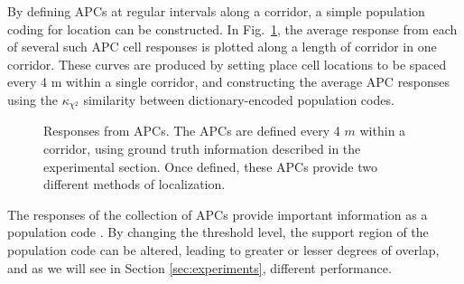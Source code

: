 By defining APCs at regular intervals along a corridor, a simple population coding for location can be constructed. In Fig.~\ref{fig:APCMany}, the average response from each of several such APC cell responses is plotted along a length of corridor in one corridor.  These curves are produced by setting place cell locations to be spaced every 4 m within a single corridor, and constructing the average APC responses using the $\kappa_{\chi^2}$ similarity between dictionary-encoded population codes.


\begin{figure}
\centering
  \setlength{}
  \setlength{}
  
\caption{Responses from APCs.  The APCs are defined every 4 $m$ within a corridor, using ground truth information described in the experimental section.  Once defined, these APCs provide two different methods of localization.}
\label{fig:APCMany}
\end{figure}

The responses of the collection of APCs provide important information as a population code \cite{pouget2000information}.  By changing the threshold level, the support region of the population code can be altered, leading to greater or lesser degrees of overlap, and as we will see in Section \ref{sec:experiments}, different performance.

